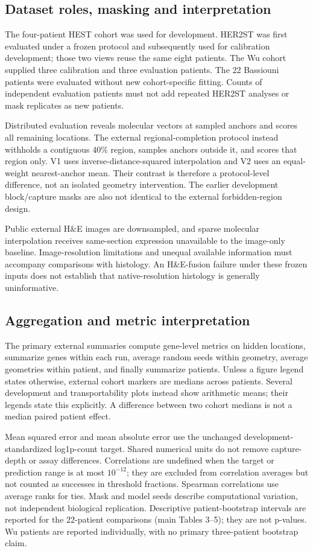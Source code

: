 \subsection{Dataset roles, masking and interpretation}
The four-patient HEST cohort was used for development. HER2ST was first evaluated under a frozen protocol and subsequently used for calibration development; those two views reuse the same eight patients. The Wu cohort supplied three calibration and three evaluation patients. The 22 Bassiouni patients were evaluated without new cohort-specific fitting. Counts of independent evaluation patients must not add repeated HER2ST analyses or mask replicates as new patients.

Distributed evaluation reveals molecular vectors at sampled anchors and scores all remaining locations. The external regional-completion protocol instead withholds a contiguous 40\% region, samples anchors outside it, and scores that region only. V1 uses inverse-distance-squared interpolation and V2 uses an equal-weight nearest-anchor mean. Their contrast is therefore a protocol-level difference, not an isolated geometry intervention. The earlier development block/capture masks are also not identical to the external forbidden-region design.

Public external H\&E images are downsampled, and sparse molecular interpolation receives same-section expression unavailable to the image-only baseline. Image-resolution limitations and unequal available information must accompany comparisons with histology. An H\&E-fusion failure under these frozen inputs does not establish that native-resolution histology is generally uninformative.

\subsection{Aggregation and metric interpretation}
The primary external summaries compute gene-level metrics on hidden locations, summarize genes within each run, average random seeds within geometry, average geometries within patient, and finally summarize patients. Unless a figure legend states otherwise, external cohort markers are medians across patients. Several development and transportability plots instead show arithmetic means; their legends state this explicitly. A difference between two cohort medians is not a median paired patient effect.

Mean squared error and mean absolute error use the unchanged development-standardized log1p-count target. Shared numerical units do not remove capture-depth or assay differences. Correlations are undefined when the target or prediction range is at most $10^{-12}$; they are excluded from correlation averages but not counted as successes in threshold fractions. Spearman correlations use average ranks for ties. Mask and model seeds describe computational variation, not independent biological replication. Descriptive patient-bootstrap intervals are reported for the 22-patient comparisons (main Tables 3--5); they are not p-values. Wu patients are reported individually, with no primary three-patient bootstrap claim.
\clearpage
